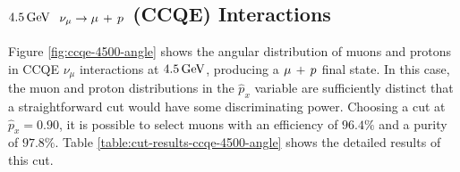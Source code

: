 \subsection{$4.5\,\mathrm{GeV}$ $\nu_\mu \rightarrow \mu\,+\,p$ (CCQE) Interactions}
Figure \ref{fig:ccqe-4500-angle} shows the angular distribution of muons and protons in \acs{CCQE} $\nu_\mu$ interactions at $4.5\,\mathrm{GeV}$, producing a $\mu\,+\,p$ final state. In this case, the muon and proton distributions in the $\hat{p}_x$ variable are sufficiently distinct that a straightforward cut would have some discriminating power. Choosing a cut at $\hat{p}_x = 0.90$, it is possible to select muons with an efficiency of $96.4\%$ and a purity of $97.8\%$. Table \ref{table:cut-results-ccqe-4500-angle} shows the detailed results of this cut.

\begin{figure}
    \centering
\end{figure}
